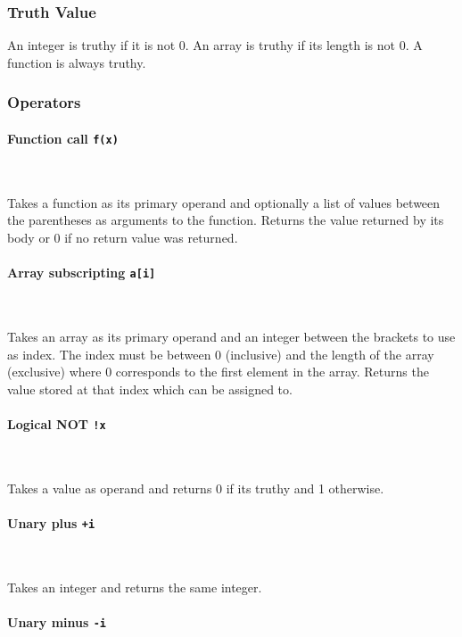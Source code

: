 \subsubsection{Truth Value}

An integer is truthy if it is not 0. An array is truthy if its length is not 0. A function is always truthy.

\subsubsection{Operators}

\paragraph{Function call \quad \texttt{f(x)}} \

Takes a function as its primary operand and optionally a list of values between the parentheses as arguments to the function. Returns the value returned by its body or 0 if no return value was returned.

\paragraph{Array subscripting \quad \texttt{a[i]}} \

Takes an array as its primary operand and an integer between the brackets to use as index. The index must be between 0 (inclusive) and the length of the array (exclusive) where 0 corresponds to the first element in the array. Returns the value stored at that index which can be assigned to.


\paragraph{Logical NOT \quad \texttt{!x}} \

Takes a value as operand and returns 0 if its truthy and 1 otherwise.

\paragraph{Unary plus \quad \texttt{+i}} \

Takes an integer and returns the same integer.

\paragraph{Unary minus \quad \texttt{-i}} \

